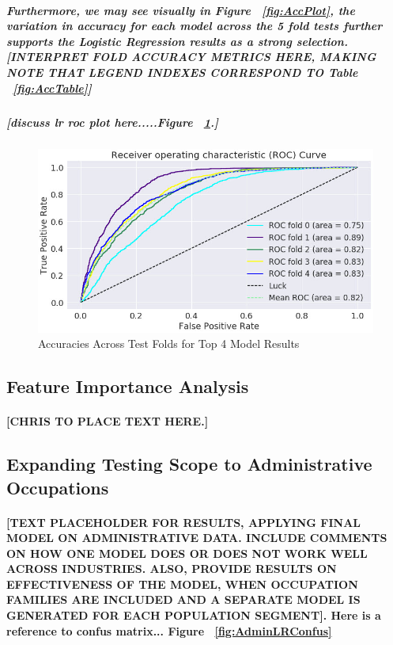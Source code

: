 \documentclass{article}
\begin{document}
\subparagraph{Furthermore, we may see visually in Figure ~\ref{fig:AccPlot}, the variation in accuracy for each model across the 5 fold tests further supports the Logistic Regression results as a strong selection.[INTERPRET FOLD ACCURACY METRICS HERE, MAKING NOTE THAT LEGEND INDEXES CORRESPOND TO Table ~\ref{fig:AccTable}]}

\subparagraph{[discuss lr roc plot here.....Figure ~\ref{fig:ROCPlot}.]}

\subparagraph{}
\begin{figure}[H]
\centering
\includegraphics[width=\linewidth]{ROCPlot.jpg}
\caption{Accuracies Across Test Folds for Top 4 Model Results}
\label{fig:ROCPlot}
\end{figure}

\subsection{Feature Importance Analysis}

\paragraph{[CHRIS TO PLACE TEXT HERE.]}


\subsection{Expanding Testing Scope to Administrative Occupations}

\paragraph{[TEXT PLACEHOLDER FOR RESULTS, APPLYING FINAL MODEL ON ADMINISTRATIVE DATA. INCLUDE COMMENTS ON HOW ONE MODEL DOES OR DOES NOT WORK WELL ACROSS INDUSTRIES. ALSO, PROVIDE RESULTS ON EFFECTIVENESS OF THE MODEL, WHEN OCCUPATION FAMILIES ARE INCLUDED AND A SEPARATE MODEL IS GENERATED FOR EACH POPULATION SEGMENT]. Here is a reference to confus matrix... Figure ~\ref{fig:AdminLRConfus}}
\end{document}
